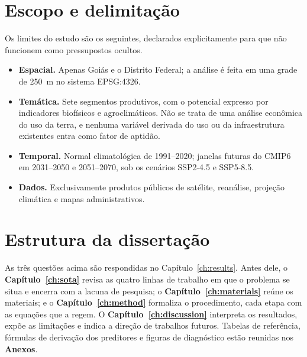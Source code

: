 \section{Escopo e delimitação}

Os limites do estudo são os seguintes, declarados explicitamente para que não funcionem como pressupostos ocultos.

\begin{itemize}
  \item \textbf{Espacial.} Apenas Goiás e o Distrito Federal; a análise é feita em uma grade de 250~m no sistema EPSG:4326.
  \item \textbf{Temática.} Sete segmentos produtivos, com o potencial expresso por indicadores
    biofísicos e agroclimáticos. Não se trata de uma análise econômica do uso da terra, e nenhuma variável
    derivada do uso ou da infraestrutura existentes entra como fator de aptidão.
  \item \textbf{Temporal.} Normal climatológica de 1991--2020; janelas futuras do CMIP6 em 2031--2050
    e 2051--2070, sob os cenários SSP2-4.5 e SSP5-8.5.
  \item \textbf{Dados.} Exclusivamente produtos públicos de satélite, reanálise, projeção climática e mapas administrativos.
\end{itemize}

\section{Estrutura da dissertação}

As três questões acima são respondidas no Capítulo~\ref{ch:results}. Antes dele, o
\textbf{Capítulo~\ref{ch:sota}} revisa as quatro linhas de trabalho em que o problema se situa e
encerra com a lacuna de pesquisa; o \textbf{Capítulo~\ref{ch:materials}} reúne os materiais; e o
\textbf{Capítulo~\ref{ch:method}} formaliza o procedimento, cada etapa com as equações que a regem.
O \textbf{Capítulo~\ref{ch:discussion}} interpreta os resultados, expõe as limitações e
indica a direção de trabalhos futuros. Tabelas de referência, fórmulas de derivação dos preditores
e figuras de diagnóstico estão reunidas nos \textbf{Anexos}.
